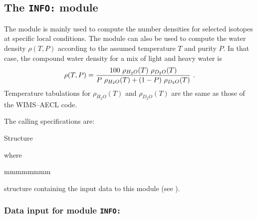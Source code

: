 \subsection{The {\tt INFO:} module}\label{sect:INFOData}

The  module is mainly used to compute the number densities for
selected isotopes at specific local conditions. The module can also be used to
compute the water density $\rho(T,P)$ according to the assumed temperature $T$
and purity $P$. In that case, the compound water density for a mix of light and 
heavy water is
  $$
\rho(T,P) = {{100\ \rho_{H_2O}(T)\ \rho_{D_2O}(T)}
\over{ P\ \rho_{H_2O}(T) +  (1-P) \ \rho_{D_2O}(T)}}\ .
  $$
\noindent
Temperature tabulations for $\rho_{H_2O}(T)$ and $\rho_{D_2O}(T)$ are the same 
as those of the WIMS--AECL code.

\vskip 0.2cm

The calling specifications are:

\begin{DataStructure}{Structure }
 \moc{::} 
\end{DataStructure}

\goodbreak
\noindent where
\begin{ListeDeDescription}{mmmmmmmm}

\item[\dstr{descinfo}] structure containing the input data to this module
(see ).

\end{ListeDeDescription}

\vskip 0.2cm

\subsubsection{Data input for module {\tt INFO:}}\label{sect:descinfo}

